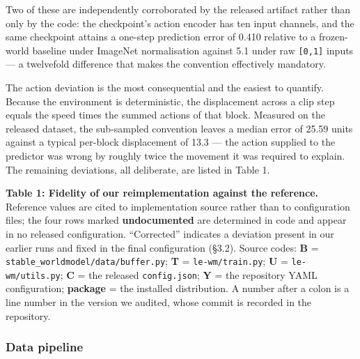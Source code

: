 \documentclass[10pt]{article}
\begin{document}
Two of these are independently corroborated by the released artifact rather than
only by the code: the checkpoint's action encoder has ten input channels, and
the same checkpoint attains a one-step prediction error of 0.410 relative to a
frozen-world baseline under ImageNet normalisation against 5.1 under raw
\texttt{{[}0,1{]}} inputs --- a twelvefold difference that makes the convention effectively
mandatory.

The action deviation is the most consequential and the easiest to quantify.
Because the environment is deterministic, the displacement across a clip step
equals the speed times the summed actions of that block. Measured on the
released dataset, the sub-sampled convention leaves a median error of 25.59
units against a typical per-block displacement of 13.3 --- the action supplied to
the predictor was wrong by roughly twice the movement it was required to
explain. The remaining deviations, all deliberate, are listed in Table 1.

\medskip\noindent
\textbf{Table 1: Fidelity of our reimplementation against the reference.} Reference
values are cited to implementation source rather than to configuration files;
the four rows marked \textbf{undocumented} are determined in code and appear in no
released configuration. ``Corrected'' indicates a deviation present in our
earlier runs and fixed in the final configuration (\S{}3.2). Source codes:
\textbf{B} = \texttt{stable\_worldmodel/data/buffer.py}; \textbf{T} = \texttt{le-wm/train.py};
\textbf{U} = \texttt{le-wm/utils.py}; \textbf{C} = the released \texttt{config.json}; \textbf{Y} = the
repository YAML configuration; \textbf{package} = the installed distribution.
A number after a colon is a line number in the version we audited, whose
commit is recorded in the repository.
\medskip

\subsubsection{Data pipeline}\label{data-pipeline}
\end{document}
